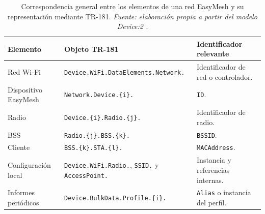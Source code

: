 \begin{table}[H]
    \centering
    \small
    \renewcommand{\arraystretch}{1.35}

    \caption[Representación de telemetría EasyMesh mediante TR-181.]
    {Correspondencia general entre los elementos de una red EasyMesh y
    su representación mediante TR-181.
    \textit{Fuente: elaboración propia a partir del modelo Device:2
    \cite{bbf_tr181}.}}

    \label{tab:representacion-telemetria-easymesh}

    \begin{tabular}{
        p{}
        p{}
        p{}
    }
        \hline
        \textbf{Elemento}
        &
        \textbf{Objeto TR-181}
        &
        \textbf{Identificador relevante}
        \\
        \hline

        Red Wi-Fi
        &
        \texttt{Device.WiFi.DataElements.Network.}
        &
        Identificador de red o controlador.
        \\

        Dispositivo EasyMesh
        &
        \texttt{Network.Device.\{i\}.}
        &
        \texttt{ID}.
        \\

        Radio
        &
        \texttt{Device.\{i\}.Radio.\{j\}.}
        &
        Identificador de radio.
        \\

        BSS
        &
        \texttt{Radio.\{j\}.BSS.\{k\}.}
        &
        \texttt{BSSID}.
        \\

        Cliente
        &
        \texttt{BSS.\{k\}.STA.\{l\}.}
        &
        \texttt{MACAddress}.
        \\

        Configuración local
        &
        \texttt{Device.WiFi.Radio.},
        \texttt{SSID.} y
        \texttt{AccessPoint.}
        &
        Instancia y referencias internas.
        \\

        Informes periódicos
        &
        \texttt{Device.BulkData.Profile.\{i\}.}
        &
        \texttt{Alias} o instancia del perfil.
        \\

        \hline
    \end{tabular}
\end{table}

